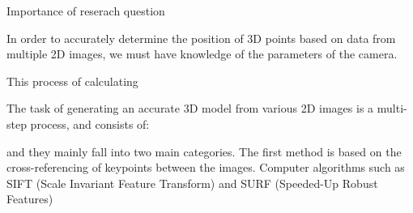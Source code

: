 Importance of reserach question

In order to accurately determine the position of 3D points based on data from multiple 2D images, we must have knowledge of the parameters of the camera.

This process of calculating




The task of generating an accurate 3D model from various 2D images is a multi-step process, and consists of:




and they mainly fall into two main categories. The first method is based on the cross-referencing of keypoints between the images. Computer algorithms such as SIFT (Scale Invariant Feature Transform) and SURF (Speeded-Up Robust Features)








